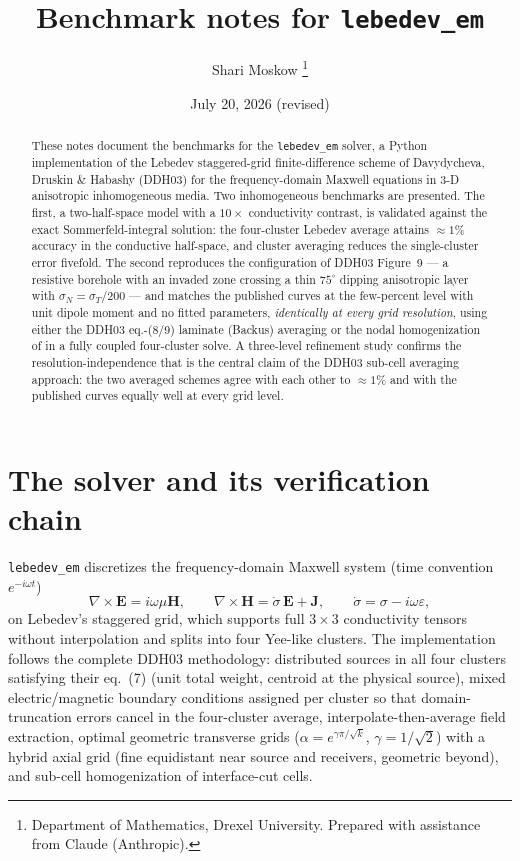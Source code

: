 \documentclass[11pt]{article}
\title{Benchmark notes for \texttt{lebedev\_em}}
\author{Shari Moskow \thanks{Department of Mathematics, Drexel University.
Prepared with assistance from Claude (Anthropic).}}
\date{July 20, 2026 (revised)}
\newcommand{\sdot}{\dot\sigma}
\begin{document}
\maketitle

\begin{abstract}
These notes document the benchmarks for the \texttt{lebedev\_em} solver, a
Python implementation of the Lebedev staggered-grid finite-difference scheme
of Davydycheva, Druskin \& Habashy \cite{DDH03} (DDH03) for the
frequency-domain Maxwell equations in 3-D anisotropic inhomogeneous media.
Two inhomogeneous benchmarks are presented. The first, a two-half-space model
with a $10\times$ conductivity contrast, is validated against the exact
Sommerfeld-integral solution: the four-cluster Lebedev average attains
$\approx 1\%$ accuracy in the conductive half-space, and cluster averaging
reduces the single-cluster error fivefold. The second reproduces the
configuration of DDH03 Figure~9 --- a resistive borehole with an invaded
zone crossing a thin $75^\circ$ dipping anisotropic layer with
$\sigma_N = \sigma_T/200$ --- and matches the published curves at the
few-percent level with unit dipole moment and no fitted parameters,
\emph{identically at every grid resolution}, using either the DDH03
eq.-(8/9) laminate (Backus) averaging or the nodal homogenization of
\cite{MDHLD99} in a fully coupled four-cluster solve. A three-level
refinement study confirms the resolution-independence that is the central
claim of the DDH03 sub-cell averaging approach: the two averaged schemes
agree with each other to $\approx 1\%$ and with the published curves
equally well at every grid level.
\end{abstract}

\section{The solver and its verification chain}

\texttt{lebedev\_em} discretizes the frequency-domain Maxwell system (time
convention $e^{-i\omega t}$)
\begin{equation}
\nabla\times \mathbf{E} = i\omega\mu\mathbf{H}, \qquad
\nabla\times \mathbf{H} = \sdot\,\mathbf{E} + \mathbf{J},
\qquad \sdot = \sigma - i\omega\varepsilon,
\end{equation}
on Lebedev's staggered grid, which supports full $3\times3$ conductivity
tensors without interpolation and splits into four Yee-like clusters. The
implementation follows the complete DDH03 methodology: distributed sources in
all four clusters satisfying their eq.~(7) (unit total weight, centroid at
the physical source), mixed electric/magnetic boundary conditions assigned
per cluster so that domain-truncation errors cancel in the four-cluster
average, interpolate-then-average field extraction, optimal geometric
transverse grids ($\alpha = e^{\gamma\pi/\sqrt{k}}$, $\gamma = 1/\sqrt2$)
with a hybrid axial grid (fine equidistant near source and receivers,
geometric beyond), and sub-cell homogenization of interface-cut cells.
\end{document}
